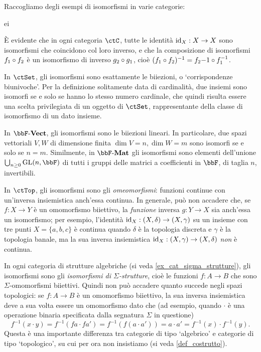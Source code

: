 \begin{examples}\label{esempi_di_iso}
	Raccogliamo degli esempi di isomorfismi in varie categorie:
	\begin{enumtag}{ei}
		\item \label{ei_1} \`E evidente che in ogni categoria \(\ctC\), tutte le identità \(\mathrm{id}_X : X\to X\) sono isomorfismi che coincidono col loro inverso, e che la composizione di isomorfismi \(f_1\circ f_2\) è un isomorfismo di inverso \(g_2\circ g_1\), cioè \((f_1\circ f_2)^{-1} = f_2 {-1}\circ f_1^{-1}\).
		\item \label{ei_2} In \(\ctSet\), gli isomorfismi sono esattamente le biiezioni, o `corrispondenze biunivoche'. Per la definizione solitamente data di cardinalità, due insiemi sono isomorfi se e solo se hanno lo stesso numero cardinale, che quindi risulta essere una scelta privilegiata di un oggetto di \(\ctSet\), rappresentante della classe di isomorfismo di un dato insieme.
		\item \label{ei_3} In \(\ctVect\), gli isomorfismi sono le biiezioni lineari. In particolare, due spazi vettoriali \(V,W\) di dimensione finita \(\dim V=n,\dim W=m\) sono isomorfi se e solo se \(n=m\). Similmente, in \(\ctMat\) gli isomorfismi sono elementi dell'unione \(\bigcup_{n\ge 0}\text{GL}(n,\bbF)\) di tutti i gruppi delle matrici a coefficienti in \(\bbF\), di taglia \(n\), invertibili.
		\item \label{ei_4} In \(\ctTop\), gli isomorfismi sono gli \emph{omeomorfismi}: funzioni continue con un'inversa insiemistica anch'essa continua. In generale, può non accadere che, se \(f : X\to Y\) è un omomorfismo biiettivo, la \emph{funzione} inversa \(g : Y\to X\) sia anch'essa un isomorfismo; per esempio, l'identità \(\mathrm{id}_X : (X,\delta)\to (X,\gamma)\) su un insieme con tre punti \(X=\{a,b,c\}\) è continua quando \(\delta\) è la topologia discreta e \(\gamma\) è la topologia banale, ma la sua inversa insiemistica \(\mathrm{id}_X : (X,\gamma)\to(X,\delta)\) \emph{non} è continua.
		\item \label{ei_5} In ogni categoria di strutture algebriche (si veda \ref{ex_cat_sigma_strutture}), gli isomorfismi sono gli \emph{isomorfismi di \(\Sigma\)-strutture}, cioè le funzioni \(f : A\to B\) che sono \(\Sigma\)-omomorfismi biiettivi. Quindi non può accadere quanto succede negli spazi topologici: se \(f : A\to B\) è un omomorfismo biiettivo, la sua inversa insiemistica deve a sua volta essere un omomorfismo dato che (ad esempio, quando \(\cdot\) è una operazione binaria specificata dalla segnatura \(\Sigma\) in questione)
		\[f^{-1}(x\cdot y) = f^{-1}(fa\cdot fa') = f^{-1}(f(a\cdot a')) = a\cdot a' = f^{-1}(x)\cdot f^{-1}(y).\]
		Questa è una importante differenza tra categorie di tipo `algebrico' e categorie di tipo `topologico', su cui per ora non insistiamo (si veda \ref{def_costrutto}).
	\end{enumtag}
\end{examples}
